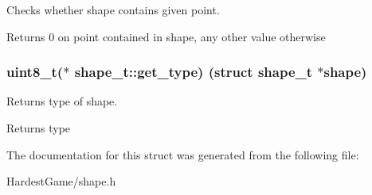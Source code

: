 Checks whether shape contains given point. 

\begin{DoxyReturn}{Returns}
0 on point contained in shape, any other value otherwise 
\end{DoxyReturn}
\subsubsection[{\texorpdfstring{get\+\_\+type}{get_type}}]{\setlength{\rightskip}{0pt plus 5cm}uint8\+\_\+t($\ast$ shape\+\_\+t\+::get\+\_\+type) (struct {\bf shape\+\_\+t} $\ast$shape)}\hypertarget{structshape__t_afc88b328b0f24d73c23d9b856debcddf}{}\label{structshape__t_afc88b328b0f24d73c23d9b856debcddf}


Returns type of shape. 

\begin{DoxyReturn}{Returns}
type 
\end{DoxyReturn}


The documentation for this struct was generated from the following file\+:\begin{DoxyCompactItemize}
\item 
Hardest\+Game/shape.\+h\end{DoxyCompactItemize}
